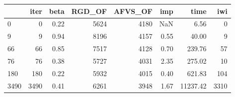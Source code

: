 \begin{tabular}{lrrrrrrr}
\toprule
{} &  iter &  beta &  RGD\_OF &  AFVS\_OF &  imp &     time &   iwi \\
\midrule
0    &     0 &  0.22 &    5624 &     4180 &  NaN &     6.56 &     0 \\
9    &     9 &  0.94 &    8196 &     4157 & 0.55 &    40.00 &     9 \\
66   &    66 &  0.85 &    7517 &     4128 & 0.70 &   239.76 &    57 \\
76   &    76 &  0.38 &    5727 &     4031 & 2.35 &   275.02 &    10 \\
180  &   180 &  0.22 &    5932 &     4015 & 0.40 &   621.83 &   104 \\
3490 &  3490 &  0.41 &    6261 &     3948 & 1.67 & 11237.42 &  3310 \\
\bottomrule
\end{tabular}
